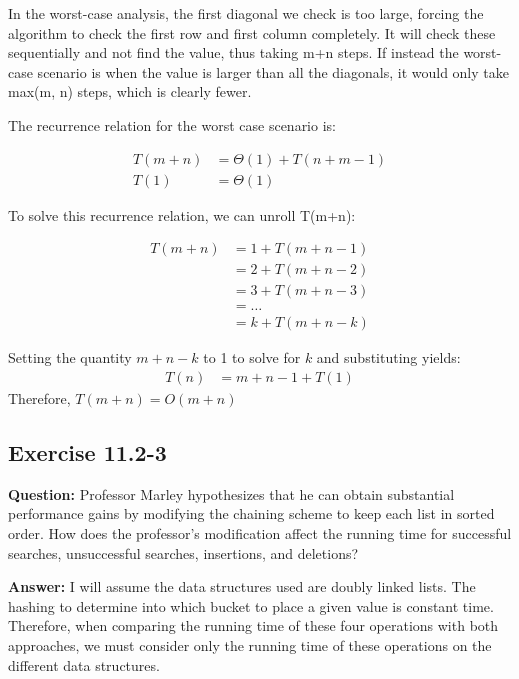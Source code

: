 \documentclass[]{book}
\theoremstyle{definition}
\begin{document}
\begin{enumerate}
    In the worst-case analysis, the first diagonal we check is too large, forcing the
    algorithm to check the first row and first column completely.
    It will check these sequentially and not find the value, thus taking m+n steps. 
    If instead the worst-case scenario is when the value is larger than all the diagonals,
    it would only take max(m, n) steps, which is clearly fewer.

    The recurrence relation for the worst case scenario is:

    \begin{align*}
        T(m+n) &= \Theta(1) + T(n + m - 1) \\
        T(1) &= \Theta(1)
    \end{align*}

    To solve this recurrence relation, we can unroll T(m+n):

    \begin{align*}
        T(m+n) &= 1 + T(m+n-1) \\
               &= 2 + T(m+n-2) \\
               &= 3 + T(m+n-3) \\
               &= \dots \\
               &= k + T(m+n-k)
    \end{align*}

    Setting the quantity $m+n-k$ to 1 to solve for $k$ and substituting yields:
    \begin{align*}
        T(n) &= m+n-1 + T(1)
    \end{align*}
    Therefore, $T(m+n) = O(m+n)$

\end{enumerate}

\subsection*{Exercise 11.2-3}

\textbf{Question:} Professor Marley hypothesizes that he can obtain substantial performance gains by
modifying the chaining scheme to keep each list in sorted order. How does the professor's 
modification affect the running time for successful searches, unsuccessful
searches, insertions, and deletions?

\noindent \textbf{Answer:} 
I will assume the data structures used are doubly linked lists. The hashing to determine 
into which bucket to place a given value is constant time. Therefore, when comparing
the running time of these four operations with both approaches, we must consider
only the running time of these operations on the different data structures.
\end{document}
